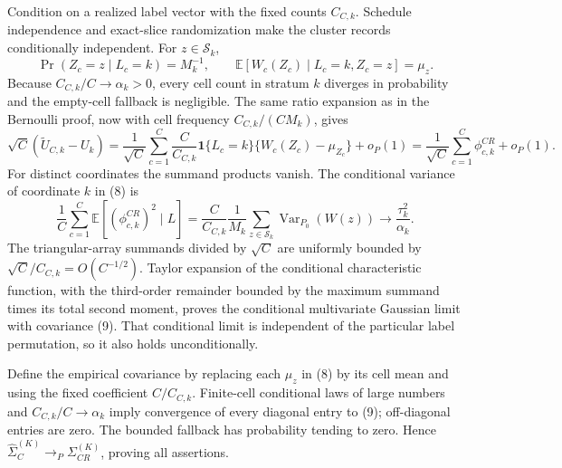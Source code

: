 Condition on a realized label vector with the fixed counts \(C_{C,k}\).  Schedule independence and exact-slice randomization make the cluster records conditionally independent.  For \(z\in\mathcal S_k\),
\[
 \Pr(Z_c=z\mid L_c=k)=M_k^{-1},\qquad
 \mathbb E[W_c(Z_c)\mid L_c=k,Z_c=z]=\mu_z.
\]
Because \(C_{C,k}/C\to\alpha_k>0\), every cell count in stratum \(k\) diverges in probability and the empty-cell fallback is negligible.  The same ratio expansion as in the Bernoulli proof, now with cell frequency \(C_{C,k}/(CM_k)\), gives
\[
 \sqrt C(\widetilde U_{C,k}-U_k)
 =\frac1{\sqrt C}\sum_{c=1}^C\frac{C}{C_{C,k}}{\mathbf 1}\{L_c=k\}
 \{W_c(Z_c)-\mu_{Z_c}\}+o_P(1)
 =\frac1{\sqrt C}\sum_{c=1}^C\phi_{c,k}^{CR}+o_P(1). \tag{8}
\]
For distinct coordinates the summand products vanish.  The conditional variance of coordinate \(k\) in (8) is
\[
 \frac1C\sum_{c=1}^C\mathbb E[(\phi_{c,k}^{CR})^2\mid L]
 =\frac{C}{C_{C,k}}\frac1{M_k}\sum_{z\in\mathcal S_k}\operatorname{Var}_{P_0}(W(z))
 \longrightarrow\frac{\tau_k^2}{\alpha_k}. \tag{9}
\]
The triangular-array summands divided by \(\sqrt C\) are uniformly bounded by \(\sqrt C/C_{C,k}=O(C^{-1/2})\).  Taylor expansion of the conditional characteristic function, with the third-order remainder bounded by the maximum summand times its total second moment, proves the conditional multivariate Gaussian limit with covariance (9).  That conditional limit is independent of the particular label permutation, so it also holds unconditionally.

Define the empirical covariance by replacing each \(\mu_z\) in (8) by its cell mean and using the fixed coefficient \(C/C_{C,k}\).  Finite-cell conditional laws of large numbers and \(C_{C,k}/C\to\alpha_k\) imply convergence of every diagonal entry to (9); off-diagonal entries are zero.  The bounded fallback has probability tending to zero.  Hence \(\widehat\Sigma_C^{(K)}\to_P\Sigma_{CR}^{(K)}\), proving all assertions.
